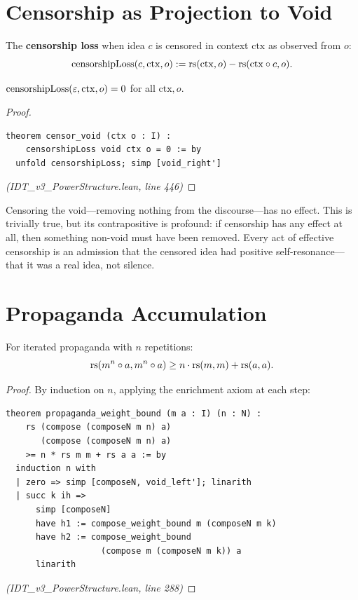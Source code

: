\section{Censorship as Projection to Void}

\begin{definition}
\label{def:censorship}
The \textbf{censorship loss} when idea $c$ is censored in context $\mathrm{ctx}$
as observed from $o$:
\[
  \mathrm{censorshipLoss}(c, \mathrm{ctx}, o) := \mathrm{rs}(\mathrm{ctx}, o) - \mathrm{rs}(\mathrm{ctx} \circ c, o).
\]
\end{definition}

\begin{theorem}
\label{thm:censor-void}
$\mathrm{censorshipLoss}(\varepsilon, \mathrm{ctx}, o) = 0$ for all $\mathrm{ctx}, o$.
\end{theorem}

\begin{proof}
\begin{lstlisting}
theorem censor_void (ctx o : I) :
    censorshipLoss void ctx o = 0 := by
  unfold censorshipLoss; simp [void_right']
\end{lstlisting}
\textit{(IDT\_v3\_PowerStructure.lean, line 446)}
\end{proof}

\begin{interpretation}
Censoring the void---removing nothing from the discourse---has no effect. This
is trivially true, but its contrapositive is profound: if censorship has any
effect at all, then something non-void must have been removed. Every act of
effective censorship is an admission that the censored idea had positive
self-resonance---that it was a real idea, not silence.
\end{interpretation}

\section{Propaganda Accumulation}

\begin{theorem}
\label{thm:propaganda-weight}
For iterated propaganda with $n$ repetitions:
\[
  \mathrm{rs}(m^n \circ a, m^n \circ a) \geq n \cdot \mathrm{rs}(m, m) + \mathrm{rs}(a, a).
\]
\end{theorem}

\begin{proof}
By induction on $n$, applying the enrichment axiom at each step:
\begin{lstlisting}
theorem propaganda_weight_bound (m a : I) (n : N) :
    rs (compose (composeN m n) a)
       (compose (composeN m n) a)
    >= n * rs m m + rs a a := by
  induction n with
  | zero => simp [composeN, void_left']; linarith
  | succ k ih =>
      simp [composeN]
      have h1 := compose_weight_bound m (composeN m k)
      have h2 := compose_weight_bound
                   (compose m (composeN m k)) a
      linarith
\end{lstlisting}
\textit{(IDT\_v3\_PowerStructure.lean, line 288)}
\end{proof}


